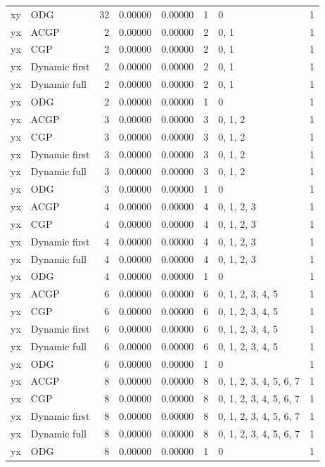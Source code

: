 \documentclass[10pt,a4paper]{article}
\begin{document}
\begin{longtable}{@{}p{23mm}p{29mm}rrrrp{36mm}r@{}}
xy & ODG & 32 & 0.00000 & 0.00000 & 1 & 0 & 1 \\
yx & ACGP & 2 & 0.00000 & 0.00000 & 2 & 0, 1 & 1 \\
yx & CGP & 2 & 0.00000 & 0.00000 & 2 & 0, 1 & 1 \\
yx & Dynamic first & 2 & 0.00000 & 0.00000 & 2 & 0, 1 & 1 \\
yx & Dynamic full & 2 & 0.00000 & 0.00000 & 2 & 0, 1 & 1 \\
yx & ODG & 2 & 0.00000 & 0.00000 & 1 & 0 & 1 \\
yx & ACGP & 3 & 0.00000 & 0.00000 & 3 & 0, 1, 2 & 1 \\
yx & CGP & 3 & 0.00000 & 0.00000 & 3 & 0, 1, 2 & 1 \\
yx & Dynamic first & 3 & 0.00000 & 0.00000 & 3 & 0, 1, 2 & 1 \\
yx & Dynamic full & 3 & 0.00000 & 0.00000 & 3 & 0, 1, 2 & 1 \\
yx & ODG & 3 & 0.00000 & 0.00000 & 1 & 0 & 1 \\
yx & ACGP & 4 & 0.00000 & 0.00000 & 4 & 0, 1, 2, 3 & 1 \\
yx & CGP & 4 & 0.00000 & 0.00000 & 4 & 0, 1, 2, 3 & 1 \\
yx & Dynamic first & 4 & 0.00000 & 0.00000 & 4 & 0, 1, 2, 3 & 1 \\
yx & Dynamic full & 4 & 0.00000 & 0.00000 & 4 & 0, 1, 2, 3 & 1 \\
yx & ODG & 4 & 0.00000 & 0.00000 & 1 & 0 & 1 \\
yx & ACGP & 6 & 0.00000 & 0.00000 & 6 & 0, 1, 2, 3, 4, 5 & 1 \\
yx & CGP & 6 & 0.00000 & 0.00000 & 6 & 0, 1, 2, 3, 4, 5 & 1 \\
yx & Dynamic first & 6 & 0.00000 & 0.00000 & 6 & 0, 1, 2, 3, 4, 5 & 1 \\
yx & Dynamic full & 6 & 0.00000 & 0.00000 & 6 & 0, 1, 2, 3, 4, 5 & 1 \\
yx & ODG & 6 & 0.00000 & 0.00000 & 1 & 0 & 1 \\
yx & ACGP & 8 & 0.00000 & 0.00000 & 8 & 0, 1, 2, 3, 4, 5, 6, 7 & 1 \\
yx & CGP & 8 & 0.00000 & 0.00000 & 8 & 0, 1, 2, 3, 4, 5, 6, 7 & 1 \\
yx & Dynamic first & 8 & 0.00000 & 0.00000 & 8 & 0, 1, 2, 3, 4, 5, 6, 7 & 1 \\
yx & Dynamic full & 8 & 0.00000 & 0.00000 & 8 & 0, 1, 2, 3, 4, 5, 6, 7 & 1 \\
yx & ODG & 8 & 0.00000 & 0.00000 & 1 & 0 & 1 \\

\end{longtable}
\end{document}
